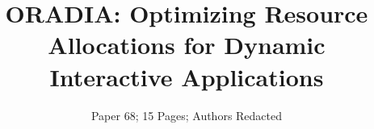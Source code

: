 \documentclass[pageno]{jpaper}
\newcommand{\pacora}{ORADIA\xspace}
\begin{document}
\title{\pacora: Optimizing Resource Allocations for Dynamic Interactive Applications}
\author{Paper 68; 15 Pages; Authors Redacted}
\date{}
\maketitle

\thispagestyle{empty}
















\appendix



\end{document}
